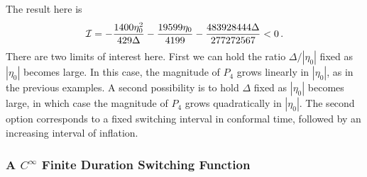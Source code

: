 \documentclass[preprint,prd,showpacs,superscriptaddress]{revtex4}
\begin{document}
 The result here is
  \begin{equation}
{\cal I}  =-\frac{1400 \eta_{0} ^2}{429 \Delta }-\frac{19599 \eta_{0} }{4199}-\frac{483928444 \Delta }{277272567}<0\,.
\end{equation}
There are two limits of interest here. First we can hold the ratio $\Delta/|\eta_0|$ fixed as $|\eta_0|$ becomes large.
In this case, the magnitude of $P_4$ grows linearly in $|\eta_0|$, as in the previous examples. A second possibility
is to hold $\Delta$ fixed as $|\eta_0|$ becomes large, in which case the magnitude of $P_4$ grows quadratically in $|\eta_0|$.
The second option corresponds to a fixed switching interval in conformal time, followed by an increasing interval of inflation.

 \subsubsection{A $C^\infty$ Finite Duration Switching Function}
\end{document}
